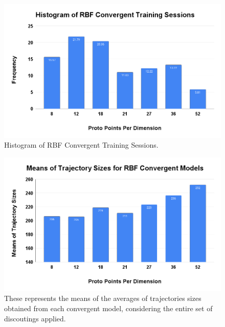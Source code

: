 \documentclass[10pt,twocolumn]{article}
\begin{document}
\begin{figure}[t]
  \includegraphics[scale=0.25]{histogram-rbf-convergent-training-sessions.png}
  \caption{Histogram of RBF Convergent Training Sessions.}
  \label{histogram_rbf_convergent_training_sessions}
\end{figure}

\begin{figure}[t]
  \includegraphics[scale=0.25]{means-of-trajectory-sizes-for-rbf-convergent-models.png}
  \caption{These represents the means of the averages of trajectories sizes obtained from each convergent model, considering the entire set of discoutings applied.}
  \label{means_of_trajectory_sizes_for_rbf_convergent_models}
\end{figure}
\end{document}
